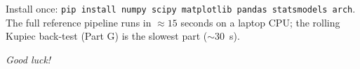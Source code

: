 \documentclass[a4paper,11pt]{article}
\begin{document}
\bigskip
\begin{warning}
Install once: \texttt{pip install numpy scipy matplotlib pandas
statsmodels arch}. The full reference pipeline runs in
$\approx 15$ seconds on a laptop CPU; the rolling Kupiec
back-test (Part G) is the slowest part ($\sim 30$~s).
\end{warning}

\bigskip
\noindent\textit{Good luck!}\par\medskip
\hfill\auteurNom\par
\hfill\auteurEmail\par
\end{document}
